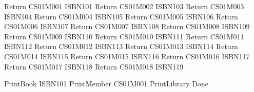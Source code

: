Return
CS01M001 ISBN101
Return
CS01M002 ISBN103
Return
CS01M003 ISBN104
Return
CS01M004 ISBN105
Return
CS01M005 ISBN106
Return
CS01M006 ISBN107
Return
CS01M007 ISBN108
Return
CS01M008 ISBN109
Return
CS01M009 ISBN110
Return
CS01M010 ISBN111
Return
CS01M011 ISBN112
Return
CS01M012 ISBN113
Return
CS01M013 ISBN114
Return
CS01M014 ISBN115
Return
CS01M015 ISBN116
Return
CS01M016 ISBN117
Return
CS01M017 ISBN118
Return
CS01M018 ISBN119

PrintBook
ISBN101
PrintMember
CS01M001
PrintLibrary
Done